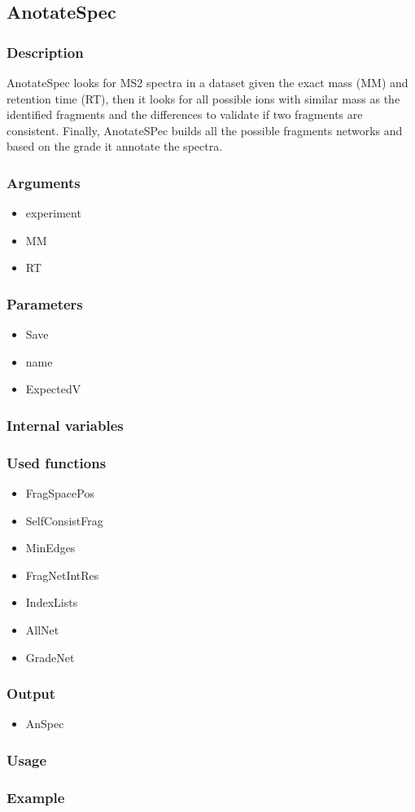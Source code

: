 \subsection{AnotateSpec}
\subsubsection{Description}
AnotateSpec looks for MS2 spectra in a dataset given the exact mass (MM) and retention time (RT), then it looks for all possible ions with similar mass as the identified fragments and the differences to validate if two fragments are consistent. Finally, AnotateSPec builds all the possible fragments networks and based on the grade it annotate the spectra.
\subsubsection{Arguments}
\begin{itemize}
\item experiment
\item MM
\item RT
\end{itemize}
\subsubsection{Parameters}
\begin{itemize}
\item Save
\item name
\item ExpectedV
\end{itemize}
\subsubsection{Internal variables}
\subsubsection{Used functions}
\begin{itemize}
\item FragSpacePos
\item SelfConsistFrag
\item MinEdges
\item FragNetIntRes
\item IndexLists
\item AllNet
\item GradeNet
\end{itemize}
\subsubsection{Output}
\begin{itemize}
\item AnSpec
\end{itemize}
\subsubsection{Usage}
\subsubsection{Example}
